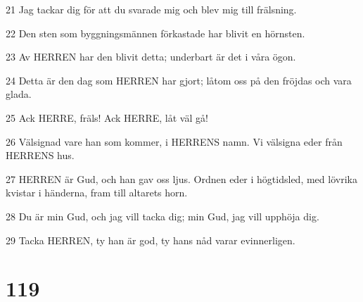 \par 21 Jag tackar dig för att du svarade mig och blev mig till frälsning.
\par 22 Den sten som byggningsmännen förkastade har blivit en hörnsten.
\par 23 Av HERREN har den blivit detta; underbart är det i våra ögon.
\par 24 Detta är den dag som HERREN har gjort; låtom oss på den fröjdas och vara glada.
\par 25 Ack HERRE, fräls! Ack HERRE, låt väl gå!
\par 26 Välsignad vare han som kommer, i HERRENS namn. Vi välsigna eder från HERRENS hus.
\par 27 HERREN är Gud, och han gav oss ljus. Ordnen eder i högtidsled, med lövrika kvistar i händerna, fram till altarets horn.
\par 28 Du är min Gud, och jag vill tacka dig; min Gud, jag vill upphöja dig.
\par 29 Tacka HERREN, ty han är god, ty hans nåd varar evinnerligen.

\chapter{119}

